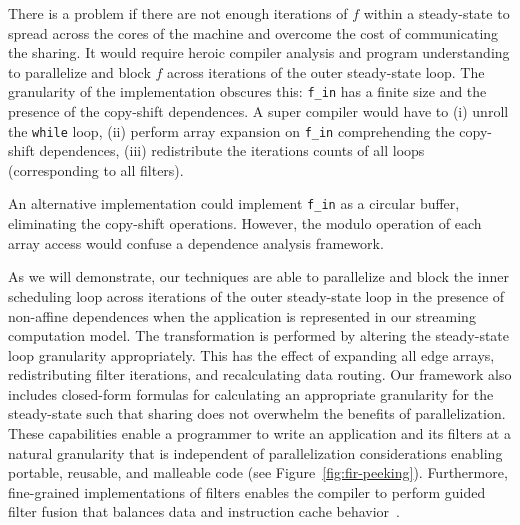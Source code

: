 There is a problem if there are not enough iterations of $f$ within a
steady-state to spread across the cores of the machine and overcome
the cost of communicating the sharing. It would require heroic
compiler analysis and program understanding to parallelize and block
$f$ across iterations of the outer steady-state loop.  The granularity
of the implementation obscures this: {\tt f\_in} has a finite size and
the presence of the copy-shift dependences.  A super compiler would
have to (i) unroll the {\tt while} loop, (ii) perform array expansion
on {\tt f\_in} comprehending the copy-shift dependences, (iii)
redistribute the iterations counts of all loops (corresponding to all
filters).

An alternative implementation could implement {\tt f\_in} as a
circular buffer, eliminating the copy-shift operations. However, the
modulo operation of each array access would confuse a dependence
analysis framework.

As we will demonstrate, our techniques are able to parallelize and
block the inner scheduling loop across iterations of the outer
steady-state loop in the presence of non-affine dependences when the
application is represented in our streaming computation model.  The
transformation is performed by altering the steady-state loop
granularity appropriately.  This has the effect of expanding all edge
arrays, redistributing filter iterations, and recalculating data
routing.  Our framework also includes closed-form formulas for
calculating an appropriate granularity for the steady-state such that
sharing does not overwhelm the benefits of parallelization.  These
capabilities enable a programmer to write an application and its
filters at a natural granularity that is independent of
parallelization considerations enabling portable, reusable, and
malleable code (see Figure~\ref{fig:fir-peeking}).  Furthermore,
fine-grained implementations of filters enables the compiler to
perform guided filter fusion that balances data and instruction cache
behavior~\cite{sermulins-lctes05}.
